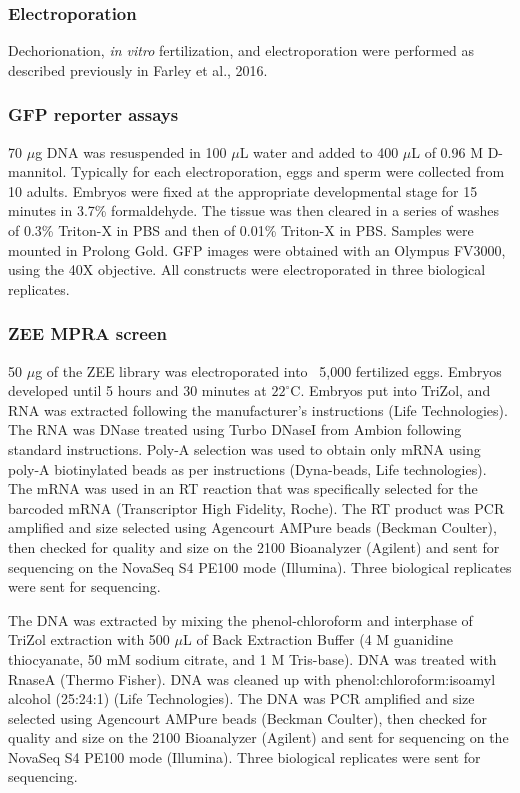 \subsubsection{Electroporation}
Dechorionation, \textit{in vitro} fertilization, and electroporation were performed as described previously in Farley et al., 2016.

\subsubsection{GFP reporter assays}
70 $\mu$g DNA was resuspended in 100 $\mu$L water and added to 400 $\mu$L of 0.96 M D-mannitol. Typically for each electroporation, eggs and sperm were collected from 10 adults. Embryos were fixed at the appropriate developmental stage for 15 minutes in 3.7\% formaldehyde. The tissue was then cleared in a series of washes of 0.3\% Triton-X in PBS and then of 0.01\% Triton-X in PBS. Samples were mounted in Prolong Gold. GFP images were obtained with an Olympus FV3000, using the 40X objective. All constructs were electroporated in three biological replicates.

\subsubsection{ZEE MPRA screen}
50 $\mu$g of the ZEE library was electroporated into ~5,000 fertilized eggs. Embryos developed until 5 hours and 30 minutes at $22^\circ$C. Embryos put into TriZol, and RNA was extracted following the manufacturer's instructions (Life Technologies). The RNA was DNase treated using Turbo DNaseI from Ambion following standard instructions. Poly-A selection was used to obtain only mRNA using poly-A biotinylated beads as per instructions (Dyna-beads, Life technologies). The mRNA was used in an RT reaction that was specifically selected for the barcoded mRNA (Transcriptor High Fidelity, Roche). The RT product was PCR amplified and size selected using Agencourt AMPure beads (Beckman Coulter), then checked for quality and size on the 2100 Bioanalyzer (Agilent) and sent for sequencing on the NovaSeq S4 PE100 mode (Illumina). Three biological replicates were sent for sequencing. 

The DNA was extracted by mixing the phenol-chloroform and interphase of TriZol extraction with 500 $\mu$L of Back Extraction Buffer (4 M guanidine thiocyanate, 50 mM sodium citrate, and 1 M Tris-base). DNA was treated with RnaseA (Thermo Fisher). DNA was cleaned up with phenol:chloroform:isoamyl alcohol (25:24:1) (Life Technologies). The DNA was PCR amplified and size selected using Agencourt AMPure beads (Beckman Coulter), then checked for quality and size on the 2100 Bioanalyzer (Agilent) and sent for sequencing on the NovaSeq S4 PE100 mode (Illumina). Three biological replicates were sent for sequencing.

